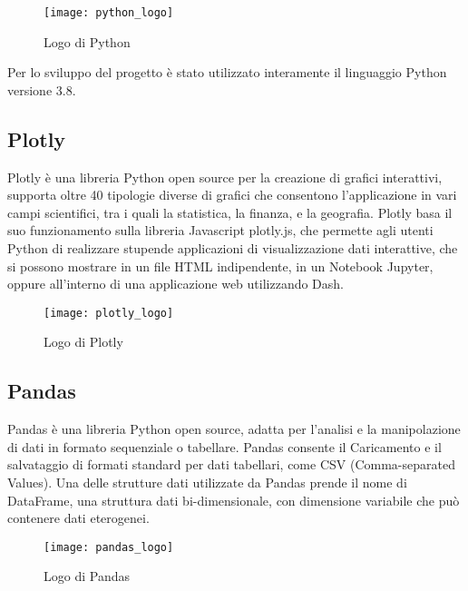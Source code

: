 \begin{figure}[htp]
    \centering
    \texttt{[image: python\_logo]}
    \caption{Logo di Python}
\end{figure}
\noindent Per lo sviluppo del progetto è stato utilizzato interamente il linguaggio Python versione 3.8.

\subsection{Plotly}

Plotly è una libreria Python open source  per la creazione di grafici interattivi, supporta oltre 40 tipologie diverse di grafici che consentono l’applicazione in vari campi scientifici, tra i quali la statistica, la finanza, e la geografia.
Plotly basa il suo funzionamento sulla libreria Javascript plotly.js, che permette agli utenti Python di realizzare stupende applicazioni di visualizzazione dati interattive, che si possono mostrare in un file HTML indipendente, in un Notebook Jupyter\footnotemark, oppure all’interno di una applicazione web utilizzando Dash.

\begin{figure}[htp]
    \centering
    \texttt{[image: plotly\_logo]}
    \caption{Logo di Plotly}
\end{figure}

\subsection{Pandas}
Pandas è una libreria Python open source, adatta per l’analisi e la manipolazione di dati in formato sequenziale o tabellare.
Pandas consente il Caricamento e il salvataggio di formati standard per dati tabellari, come CSV (Comma-separated Values).
Una delle strutture dati utilizzate da Pandas prende il nome di DataFrame, una struttura dati bi-dimensionale, con dimensione variabile che può contenere dati eterogenei.
\begin{figure}[htp]
    \centering
    \texttt{[image: pandas\_logo]}
    \caption{Logo di Pandas}
\end{figure}

